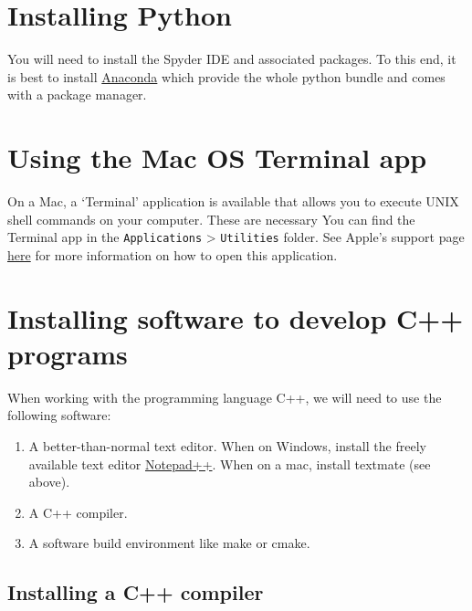 \documentclass[
]{book}
\providecommand{\tightlist}{%
  \setlength{\itemsep}{0pt}\setlength{\parskip}{0pt}}
\begin{document}
\hypertarget{installing-python}{%
\section{Installing Python}\label{installing-python}}

You will need to install the Spyder IDE and associated packages. To this end, it is best to install \href{https://www.anaconda.com/products/individual}{Anaconda} which provide the whole python bundle and comes with a package manager.

\hypertarget{MacTerminal}{%
\section{Using the Mac OS Terminal app}\label{MacTerminal}}

On a Mac, a `Terminal' application is available that allows you to execute UNIX shell commands on your computer. These are necessary You can find the Terminal app in the \texttt{Applications} \textgreater{} \texttt{Utilities} folder. See Apple's support page \href{https://support.apple.com/en-gb/guide/terminal/apd5265185d-f365-44cb-8b09-71a064a42125/mac}{here} for more information on how to open this application.

\hypertarget{installing-software-to-develop-c-programs}{%
\section{Installing software to develop C++ programs}\label{installing-software-to-develop-c-programs}}

When working with the programming language C++, we will need to use the following software:

\begin{enumerate}
\def\labelenumi{\arabic{enumi}.}
\tightlist
\item
  A better-than-normal text editor. When on Windows, install the freely available text editor \href{}{Notepad++}. When on a mac, install textmate (see above).
\item
  A C++ compiler.
\item
  A software build environment like make or cmake.
\end{enumerate}

\hypertarget{installing-a-c-compiler}{%
\subsection{Installing a C++ compiler}\label{installing-a-c-compiler}}
\end{document}
